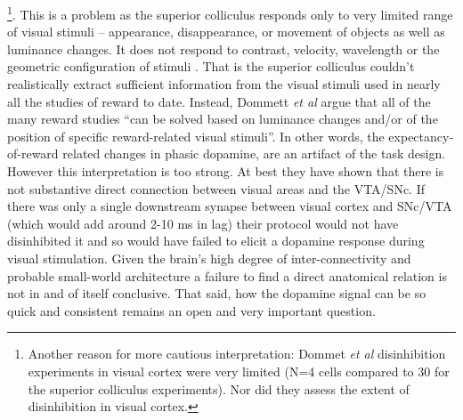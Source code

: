 \documentclass[doc,12pt]{apa}        %
\begin{document}
\footnote{
    Another reason for more cautious interpretation: Dommet \emph{et al} disinhibition experiments in visual cortex were very limited (N=4 cells compared to 30 for the superior colliculus experiments).  Nor did they assess the extent of disinhibition in visual cortex.
}. This is a problem as the superior colliculus responds only to very limited range of visual stimuli -- appearance, disappearance, or movement of objects as well as luminance changes.  It does not respond to contrast, velocity, wavelength or the geometric configuration of stimuli \cite{Dommett:2005p7263}. That is the superior colliculus couldn't realistically extract sufficient information from the visual stimuli used in nearly all the studies of reward to date.  Instead, Dommett \emph{et al} argue that all of the many reward studies ``can be solved based on luminance changes and/or of the position of specific reward-related visual stimuli''.  In other words, the expectancy-of-reward related changes in phasic dopamine, are an artifact of the task design.  However this interpretation is too strong.  At best they have shown that there is not substantive direct connection between visual areas and the VTA/SNc.  If there was only a single downstream synapse between visual cortex and SNc/VTA (which would add around 2-10 ms in lag) their protocol would not have disinhibited it and so would have failed to elicit a dopamine response during visual stimulation.   Given the brain's high degree of inter-connectivity and probable small-world architecture \cite{bassett:2006aa} a failure to find a direct anatomical relation is not in and of itself conclusive.  That said, how the dopamine signal can be so quick and consistent remains an open and very important question.
\end{document}
